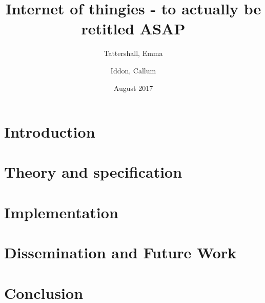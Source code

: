 \documentclass{article}
\title{Internet of thingies - to actually be retitled ASAP}
\author{
  Tattershall, Emma
  \and
  Iddon, Callum
}
\date{August 2017}
\begin{document}
\maketitle

\section{Introduction}


\section{Theory and specification}


\section{Implementation}


\section{Dissemination and Future Work}


\section{Conclusion}

\end{document}
